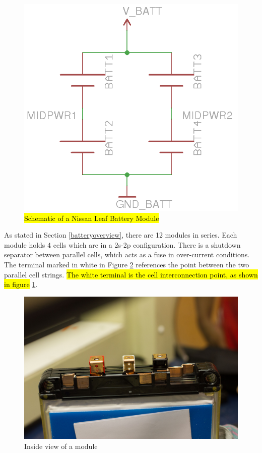 \documentclass{article}
\DeclareRobustCommand{\hlr}[1]{{\sethlcolor{red}\hl{#1}}}
\begin{document}

            \begin{figure}[H]
            \centering
            \includegraphics{moduleschem}
            \caption{\hlr{Schematic of a Nissan Leaf Battery Module}}
            \label{module}
            \end{figure}

            As stated in Section \ref{batteryoverview}, there are 12 modules in series. Each module holds 4 cells which are in a 2s-2p configuration. There is a shutdown separator between parallel cells, which acts as a fuse in over-current conditions. The terminal marked in white in Figure \ref{canopener} references the point between the two parallel cell strings. \hlr{The white terminal is the cell interconnection point, as shown in figure} \ref{module}.

            \begin{figure}[H]
            \centering
            \includegraphics[width = 0.6 \textwidth]{OpenModule}
            \caption{Inside view of a module}
            \label{canopener}
            \end{figure}
\end{document}
